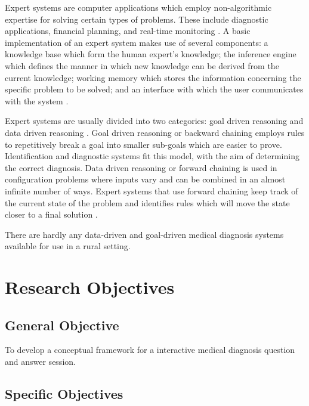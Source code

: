 Expert systems are computer applications which employ non-algorithmic expertise for solving certain types of problems.
 These include diagnostic applications, financial planning, and real-time monitoring \cite{Merritt:2010}.
A basic implementation of an expert system makes use of several components:
a knowledge base which form the human expert's knowledge; 
the inference engine which defines the manner in which new knowledge can be derived from the current knowledge; 
working memory which stores the information concerning the specific problem to be solved; 
and an interface with which the user communicates with the system \cite{Agarwal:2014}. 

Expert systems are usually divided into two categories: goal driven reasoning and data driven reasoning \cite{Merritt:2010}. 
Goal driven reasoning or backward chaining employs rules to repetitively break a goal into smaller sub-goals which are easier to prove. 
Identification and diagnostic systems fit this model, with the aim of determining the correct diagnosis. 
Data driven reasoning or forward chaining is used in configuration problems where inputs vary and can be combined in an almost infinite number of ways. 
Expert systems that use forward chaining keep track of the current state of the problem and identifies rules which will move the state closer to a final solution .

There are hardly any data-driven and goal-driven medical diagnosis systems available for use in a rural setting.

\section{Research Objectives}
\label{sec:researchobjectives}

\subsection{General Objective}
\label{sec:generalobjective}

To develop a conceptual framework for a interactive medical diagnosis question and answer session.

\subsection{Specific Objectives}
\label{sec:specificobjectives}

